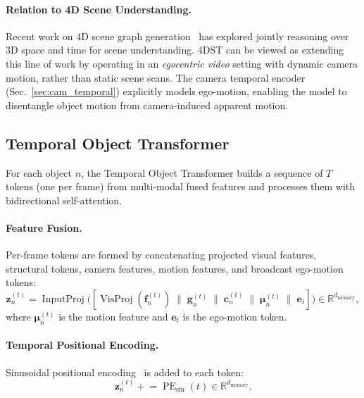 \documentclass[runningheads]{llncs}
\newcommand{\mR}{\mathbb{R}}
\newcommand{\op}[1]{\operatorname{#1}}
\newcommand{\mat}[1]{\bm{#1}}
\begin{document}
\paragraph{Relation to 4D Scene Understanding.}  Recent work on 4D scene graph generation~\cite{wald2020learning} has explored jointly reasoning over 3D space and time for scene understanding.  4DST can be viewed as extending this line of work by operating in an \emph{egocentric video} setting with dynamic camera motion, rather than static scene scans.  The camera temporal encoder (Sec.~\ref{sec:cam_temporal}) explicitly models ego-motion, enabling the model to disentangle object motion from camera-induced apparent motion.


\subsection{Temporal Object Transformer}
\label{sec:temporal_transformer}

For each object $n$, the Temporal Object Transformer builds a sequence of $T$ tokens (one per frame) from multi-modal fused features and processes them with bidirectional self-attention.

\paragraph{Feature Fusion.}  Per-frame tokens are formed by concatenating projected visual features, structural tokens, camera features, motion features, and broadcast ego-motion tokens:
\begin{equation}
    \mat{z}_n^{(t)} = \op{InputProj}\bigl([\op{VisProj}(\mat{f}_n^{(t)}) \;\|\; \mat{g}_n^{(t)} \;\|\; \mat{c}_n^{(t)} \;\|\; \mat{\mu}_n^{(t)} \;\|\; \mat{e}_t]\bigr) \in \mR^{d_{\text{memory}}},
    \label{eq:4dst_fusion}
\end{equation}
where $\mat{\mu}_n^{(t)}$ is the motion feature and $\mat{e}_t$ is the ego-motion token.

\paragraph{Temporal Positional Encoding.}  Sinusoidal positional encoding~\cite{vaswani2017attention} is added to each token:
\begin{equation}
    \mat{z}_n^{(t)} \mathrel{+}= \op{PE}_{\text{sin}}(t) \in \mR^{d_{\text{memory}}}.
    \label{eq:4dst_pe}
\end{equation}
\end{document}

